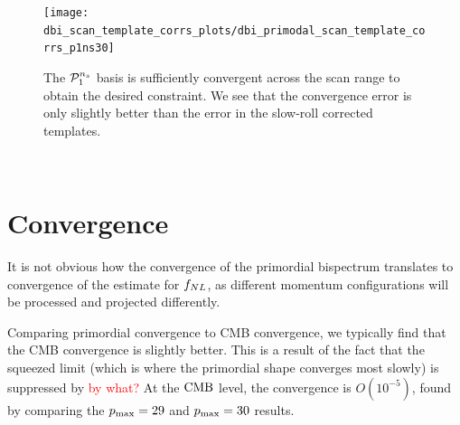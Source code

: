 \begin{figure}[!pth]
\centering
\texttt{[image: dbi\_scan\_template\_corrs\_plots/dbi\_primodal\_scan\_template\_corrs\_p1ns30]}
\caption{
    The $\mathcal{P}^{n_s}_1$ basis is sufficiently convergent across the scan range
    to obtain the desired constraint.
    We see that the convergence error is only slightly better than the error
    in the slow-roll corrected templates.
}\label{fig:dbi_primodal_scan_template_corrs_p1ns}
\end{figure}
    \\
\section{Convergence}
    It is not obvious how the convergence of the primordial bispectrum translates to
    convergence of the estimate for $f_{NL}$, as different
    momentum configurations will be processed and projected differently.


    Comparing primordial convergence to CMB convergence,
    we typically find that the CMB convergence is slightly better.
    This is a result of the fact that
    the squeezed limit (which is where the primordial shape converges most slowly)
    is suppressed by \textcolor{red}{by what?}
    At the $\text{CMB}$ level, the convergence is $O(10^{-5})$,
    found by comparing the $p_\text{max}=29$ and $p_\text{max}=30$ results.


